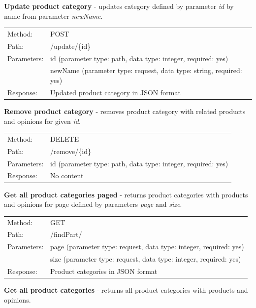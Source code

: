 \documentclass[12pt,a4paper]{article}
\begin{document}
\noindent\textbf{Update product category} - updates category defined by parameter \textit{id} by name from parameter \textit{newName}. 

{\renewcommand{\arraystretch}{1}
  \begin{tabular}{ll}
  Method: & POST \\
  Path: & /update/\{id\} \\
  Parameters: & id (parameter type: path, data type: integer, required: yes)\\
              & newName (parameter type: request, data type: string, required: yes)\\
  Response: & Updated product category in JSON format  \\
  \end{tabular} \vspace{5mm}
}

\noindent\textbf{Remove product category} - removes product category with related products and opinions for given \textit{id}.

{\renewcommand{\arraystretch}{1}
  \begin{tabular}{ll}
  Method: & DELETE \\
  Path: & /remove/\{id\} \\
  Parameters: & id (parameter type: path, data type: integer, required: yes)\\
  Response: & No content  \\
  \end{tabular} \vspace{5mm}
}

\noindent\textbf{Get all product categories paged} - returns product categories with products and opinions for page defined by parameters \textit{page} and \textit{size}.

{\renewcommand{\arraystretch}{1}
  \begin{tabular}{ll}
  Method: & GET \\
  Path: & /findPart/ \\
  Parameters: & page (parameter type: request, data type: integer, required: yes)\\
              & size (parameter type: request, data type: integer, required: yes)\\
  Response: & Product categories in JSON format  \\
  \end{tabular} \vspace{5mm}
  }
  
\noindent\textbf{Get all product categories} - returns all product categories with products and opinions.
\end{document}
